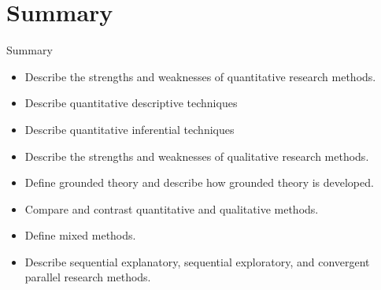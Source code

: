 \section{Summary}\label{ch14:summary}

\begin{center}
	\begin{tkawybox}{Summary}
		\begin{itemize}
			\setlength{\itemsep}{0pt}
			\setlength{\parskip}{0pt}
			\setlength{\parsep}{0pt}
			
			\item Describe the strengths and weaknesses of quantitative research methods.
			\item Describe quantitative descriptive techniques
			\item Describe quantitative inferential techniques
			\item Describe the strengths and weaknesses of qualitative research methods.
			\item Define grounded theory and describe how grounded theory is developed.
			\item Compare and contrast quantitative and qualitative methods.
			\item Define mixed methods.
			\item Describe sequential explanatory, sequential exploratory, and convergent parallel research methods.
		\end{itemize}
	\end{tkawybox}
\end{center}
